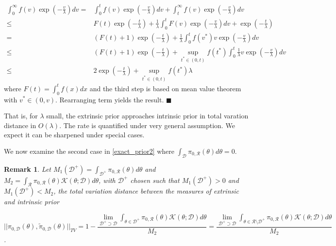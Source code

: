 \documentclass[10pt]{article}
\newcommand{\leo}[1]{{\color{blue}{LD: #1}}}
\newtheorem{remark}{Remark}
\newcommand{\mc}[1]{\mathcal{#1}}
\DeclareMathOperator{\1}{\mathbbm{1}}
\begin{document}
\begin{equation}
\begin{aligned}
\int_0^\infty {f(v)} \exp(- \frac{v}{\lambda}) d v
= & \int_0^t {f(v)} \exp(- \frac{v}{\lambda}) d v + \int_t^\infty {f(v)} \exp(- \frac{v}{\lambda}) d v \\
\le & {F(t)} \exp(-\frac{t}{\lambda}) + 
\frac{1}{\lambda}\int_0^t {F(v)} \exp(-\frac{v}{\lambda})dv + \exp(-\frac{t}{\lambda}) \\
= & ({F(t)} +1) \exp(-\frac{t}{\lambda}) + 
\frac{1}{\lambda}\int_0^t {f(v^*)} v\exp(-\frac{v}{\lambda})dv \\
\le & ({F(t)} +1) \exp(-\frac{t}{\lambda}) + \sup_{t^*\in(0,t)} {f(t^*)}
\int_0^t  \frac{1}{\lambda}v\exp(-\frac{v}{\lambda})dv \\
\le & 2 \exp(-\frac{t}{\lambda}) + \sup_{t^*\in(0,t)} {f(t^*)}\lambda 
\end{aligned}
\end{equation}
where $F(t)=\int_0^t f(x)dx$ and the third step is based on mean value theorem with $v^*\in (0,v)$. Rearranging term yields the result.  $\blacksquare$

That is, for $\lambda$ small, the extrinsic prior approaches intrinsic prior in total varation distance in $O(\lambda)$. The rate is quantified under very general assumption. We expect it can be sharpened under special cases.

We now examine the second case in \eqref{exact_prior2} where ${ \int_{\mc D} \pi_{0,\mc R}(\theta)d\theta }=0$.


\leo{this needs some more work}
\begin{remark}
Let $M_1(\mc D^+)= \int_{\mc D^+} \pi_{0,\mc R}(\theta)d\theta$ and $M_2 = \int_{\mc R} \pi_{0,\mc R}(\theta) \mc K(\theta;\mc D)d\theta$, with $\mc D^+$ chosen such that $M_1(\mc D^+)>0$ and $M_1(\mc D^+)<M_2$, the total variation distance between the measures of extrinsic and intrinsic prior

$$||\pi_{0,\mc D}(\theta), \tilde{\pi}_{0,\mc D}      (\theta) ||_{TV} = 1 - \frac{\lim_{\mc D^+\supset \mc D}\int_{\theta  \in \mc D^+} \pi_{0,\mc R}(\theta) \mc K(\theta;\mc D)d\theta}{M_2} = \frac{\lim_{\mc D^+\supset \mc D}\int_{\theta  \in \mc R \setminus \mc D^+} \pi_{0,\mc R}(\theta) \mc K(\theta;\mc D)d\theta}{M_2}$$.
\end{remark}
\end{document}
